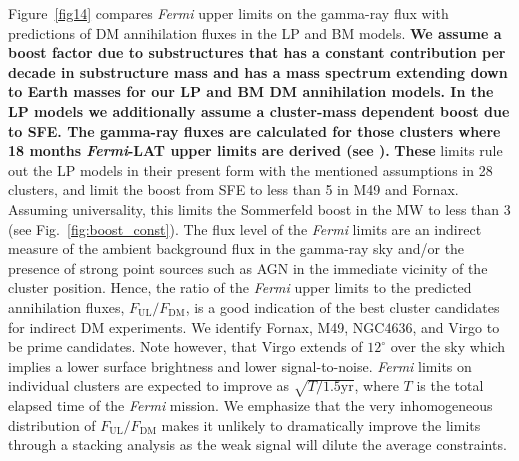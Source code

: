 \documentclass[10pt,aps,pra,reprint,amsmath,amsfonts,amssymb,showpacs,nofootinbib,floatfix]{revtex4-1}
\def\del#1{{}}
\def\C#1{{\bf #1}}
\newcommand{\Fermi}{{\em Fermi}\xspace}
\begin{document}
Figure~\ref{fig14} compares \Fermi upper limits on the gamma-ray flux
with predictions of DM annihilation fluxes in the LP and BM
models. \C{We assume a boost factor due to substructures that has a
  constant contribution per decade in substructure mass and has a mass
  spectrum extending down to Earth masses for our LP and BM DM
  annihilation models. In the LP models we additionally assume a
  cluster-mass dependent boost due to SFE. The gamma-ray fluxes are
  calculated for those clusters where 18 months \Fermi-LAT upper
  limits are derived (see \cite{2010ApJ...717L..71A}).} \del{To obtain
  the gamma-ray fluxes, we scale the virial mass of clusters in the
  extended HIFLUGCS catalogue \cite{2007A&A...466..805C} with our
  scaling relation of Eq.~(\ref{eq:DM_scaling}). In those, we assume a
  boost factor due to substructures that has a constant contribution
  per decade in substructure mass and has a mass spectrum extending
  down to Earth masses for our LP and BM DM annihilation models. In
  the LP models we additionally assume a cluster-mass dependent boost
  due to SFE.}  \del{\Fermi} \C{These} limits rule out the LP models
in their present form with the mentioned assumptions in 28 clusters,
and limit the boost from SFE to less than 5 in M49 and
Fornax. Assuming universality, this limits the Sommerfeld boost in the
MW to less than 3 (see Fig.~\ref{fig:boost_const}). The flux level of
the \Fermi limits are an indirect measure of the ambient background
flux in the gamma-ray sky and/or the presence of strong point sources
such as AGN in the immediate vicinity of the cluster position. Hence,
the ratio of the \Fermi upper limits to the predicted annihilation
fluxes, $F_{\mathrm{UL}}/F_{\mathrm{DM}}$, is a good indication of the
best cluster candidates for indirect DM experiments. We identify
Fornax, M49, NGC4636, and Virgo to be prime candidates. Note however,
that Virgo extends of $12^\circ$ over the sky which implies a lower
surface brightness and lower signal-to-noise. \Fermi limits on
individual clusters are expected to improve as $\sqrt{T/1.5
  \mathrm{yr}}$, where $T$ is the total elapsed time of the \Fermi
mission. We emphasize that the very inhomogeneous distribution of
$F_{\mathrm{UL}} / F_{\mathrm{DM}}$ makes it unlikely to dramatically
improve the limits through a stacking analysis as the weak signal will
dilute the average constraints.
\end{document}
